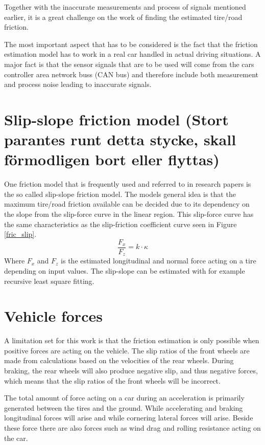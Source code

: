 Together with the inaccurate measurements and process of signals mentioned earlier, it is a great challenge on the work of finding the estimated tire/road friction.  

The most important aspect that has to be considered is the fact that the friction estimation model has to work in a real car handled in actual driving situations. A major fact is that the sensor signals that are to be used  will come from the cars controller area network buss (CAN bus) and therefore include both measurement and process noise leading to inaccurate signals. 

\section{Slip-slope friction model (Stort parantes runt detta stycke, skall förmodligen bort eller flyttas)}

One friction model that is frequently used and referred to in research papers is the so called slip-slope friction model. The models general idea is that the maximum tire/road friction available can be decided due to its dependency on the slope from the slip-force curve in the linear region. This slip-force curve has the same characteristics as the slip-friction coefficient curve seen in Figure \ref{fric_slip}. 
\begin{equation}
\dfrac{F_{x}}{F_{z}} = k \cdot \kappa
\end{equation}
Where $ F_{x} $ and $ F_{z} $ is the estimated longitudinal and normal force acting on a tire depending on input values. The slip-slope can be estimated with for example recursive least square fitting.

\section{Vehicle forces}

A limitation set for this work is that the friction estimation is only possible when positive forces are acting on the vehicle. The slip ratios of the front wheels are made from calculations based on the velocities of the rear wheels. During braking, the rear wheels will also produce negative slip, and thus negative forces, which means that the slip ratios of the front wheels will be incorrect. 

The total amount of force acting on a car during an acceleration is primarily generated between the tires and the ground. While accelerating and braking longitudinal forces will arise and while cornering lateral forces will arise. Beside these force there are also forces such as wind drag and rolling resistance acting on the car. 

